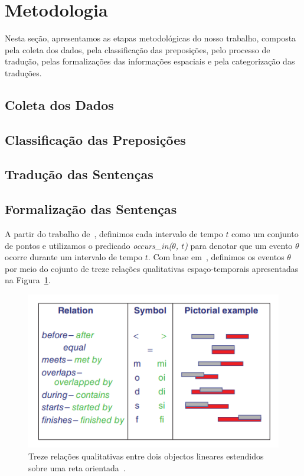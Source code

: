 \documentclass[a4paper, twocolumn, 11pt, twoside]{article}
\begin{document}
\section{Metodologia}
Nesta seção, apresentamos as etapas metodológicas do nosso trabalho, composta pela coleta dos dados, pela classificação das preposições, pelo processo de tradução, pelas formalizações das informações espaciais e pela categorização das traduções. 

\subsection{Coleta dos Dados}

\subsection{Classificação das Preposições}

\subsection{Tradução das Sentenças}


\subsection{Formalização das Sentenças}

A partir do trabalho de~\citet{spranger2016robust}, definimos cada intervalo de tempo $t$ como um conjunto de pontos e utilizamos o predicado \textit{occurs\_in($\theta$, $t$)} para denotar que um evento $\theta$ ocorre durante um intervalo de tempo $t$.
Com base em~\citet{freksa2016neighborhood}, definimos os eventos $\theta$ por meio do cojunto de treze relações qualitativas espaço-temporais apresentadas na Figura~\ref{fig:13_relations}.

\begin{figure}[ht]
	\centering
	\includegraphics[width=\columnwidth]{Figures/13_concep_neigb_relat.png}
	\caption{Treze relações qualitativas entre dois objectos lineares estendidos sobre uma reta orientada~\citep{freksa2016neighborhood}.}
	\label{fig:13_relations}
\end{figure}
\end{document}
